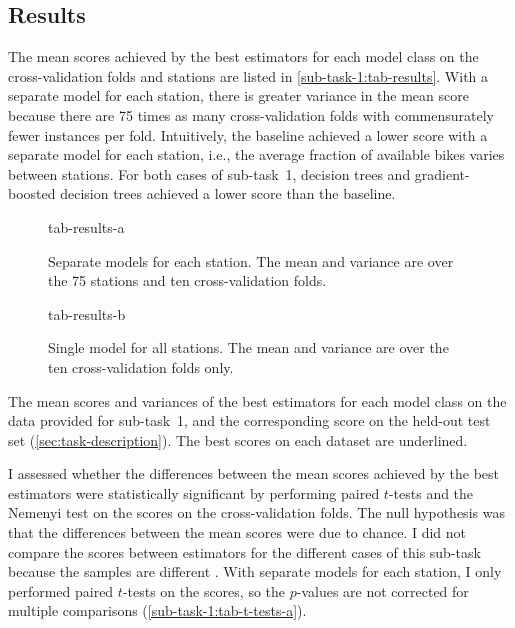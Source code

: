 \subsection{Results}
\label{sec:sub-task-1:results}

The mean scores achieved by the best estimators for each model class on the
cross-validation folds and stations are listed in \cref{sub-task-1:tab-results}.
With a separate model for each station, there is greater variance in the mean score
because there are 75 times as many cross-validation folds with commensurately fewer
instances per fold.
Intuitively, the baseline achieved a lower score with a separate model for each
station, i.e., the average fraction of available bikes varies between stations.
For both cases of sub-task~1, decision trees and gradient-boosted decision trees
achieved a lower score than the baseline.

\begin{table}
  \centering
  \begin{subfigure}{0.6\textwidth}
    \centering
    {tab-results-a}
    \caption{
      Separate models for each station.
      The mean and variance are over the 75 stations and ten cross-validation folds.
    }
    \label{sub-task-1:tab-results-a}
  \end{subfigure}
  \subfigurespace
  \begin{subfigure}{0.6\textwidth}
    \centering
    {tab-results-b}
    \caption{
      Single model for all stations.
      The mean and variance are over the ten cross-validation folds only.
    }
    \label{sub-task-1:tab-results-b}
  \end{subfigure}
  \caption{ The mean scores and variances of the best estimators for each
    model class on the data provided for sub-task~1, and the corresponding score on the
    held-out test set (\cref{sec:task-description}).
    The best scores on each dataset are underlined.
  }
  \label{sub-task-1:tab-results}
\end{table}

I assessed whether the differences between the mean scores achieved by the best
estimators were statistically significant by performing paired $t$-tests and the
Nemenyi test on the scores on the cross-validation folds.
The null hypothesis was that the differences between the mean scores were due to
chance.
I did not compare the scores between estimators for the different cases of this
sub-task because the samples are different \parencite[354]{Flach2012}.
With separate models for each station, I only performed paired $t$-tests on the scores,
so the $p$-values are not corrected for multiple comparisons
(\cref{sub-task-1:tab-t-tests-a}).


